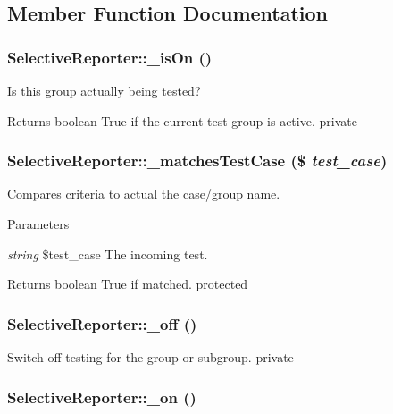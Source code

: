 \subsection{Member Function Documentation}
\hypertarget{class_selective_reporter_a84b7ad4af2744887f8f60e504a027647}{
\subsubsection[{\_\-isOn}]{\setlength{\rightskip}{0pt plus 5cm}SelectiveReporter::\_\-isOn ()}}
\label{class_selective_reporter_a84b7ad4af2744887f8f60e504a027647}
Is this group actually being tested? \begin{DoxyReturn}{Returns}
boolean True if the current test group is active.  private 
\end{DoxyReturn}
\hypertarget{class_selective_reporter_af2344a42987b67d671c8e02a91c5b4fd}{
\subsubsection[{\_\-matchesTestCase}]{\setlength{\rightskip}{0pt plus 5cm}SelectiveReporter::\_\-matchesTestCase (\$ {\em test\_\-case})}}
\label{class_selective_reporter_af2344a42987b67d671c8e02a91c5b4fd}
Compares criteria to actual the case/group name. 
\begin{DoxyParams}{Parameters}
\item[{\em string}]\$test\_\-case The incoming test. \end{DoxyParams}
\begin{DoxyReturn}{Returns}
boolean True if matched.  protected 
\end{DoxyReturn}
\hypertarget{class_selective_reporter_a2e55fad83e680bd660ab309b86d72d88}{
\subsubsection[{\_\-off}]{\setlength{\rightskip}{0pt plus 5cm}SelectiveReporter::\_\-off ()}}
\label{class_selective_reporter_a2e55fad83e680bd660ab309b86d72d88}
Switch off testing for the group or subgroup.  private \hypertarget{class_selective_reporter_aa09eb9deff7a2fcd6f35cb441b4458cb}{
\subsubsection[{\_\-on}]{\setlength{\rightskip}{0pt plus 5cm}SelectiveReporter::\_\-on ()}}
